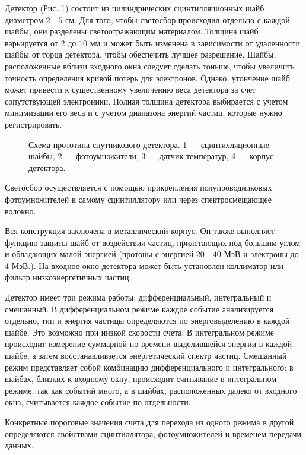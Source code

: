 \documentclass{config}
\begin{document}
Детектор (Рис. \ref{detector}) состоит из цилиндрических сцинтилляционных шайб диаметром $2$ - $5$ см. Для того, чтобы светосбор происходил отдельно с каждой шайбы, они разделены светоотражающим материалом. Толщина шайб варьируется от $2$ до $10$ мм и может быть изменена в зависимости от удаленности шайбы от торца детектора, чтобы обеспечить лучшее разрешение. Шайбы, расположенные вблизи входного окна следует сделать тоньше, чтобы увеличить точность определения кривой потерь для электронов. Однако, утончение шайб может привести к существенному увеличению веса детектора за счет сопутствующей электроники. Полная толщина детектора выбирается с учетом минимизации его веса и с учетом диапазона энергий частиц, которые нужно регистрировать.

\begin{figure}[h!]
\caption{Схема прототипа спутникового детектора. 1 --- сцинтилляционные шайбы, 2 --- фотоумножители, 3 --- датчик температур, 4 --- корпус детектора.}
\label{detector}
\end{figure}

Светосбор осуществляется с помощью прикрепления полупроводниковых фотоумножителей к самому сцинтиллятору или через спектросмещающее волокно.


Вся конструкция заключена в металлический корпус. Он также выполняет функцию защиты шайб от воздействия частиц, прилетающих под большим углом и обладающих малой энергией (протоны с энергией $20$ - $40$ МэВ и электроны до $4$ МэВ.). На входное окно детектора может быть установлен коллиматор или фильтр низкоэнергетичных частиц.

Детектор имеет три режима работы: дифференциальный, интегральный и смешанный. В дифференциальном режиме каждое событие анализируется отдельно, тип и энергия частицы определяются по энерговыделению в каждой шайбе. Это возможно при низкой скорости счета. В интегральном режиме происходит измерение суммарной по времени выделившейся энергии в каждой шайбе, а затем восстанавливается энергетический спектр частиц. Смешанный режим представляет собой комбинацию дифференциального и интегрального: в шайбах, близких к входному окну, происходит считывание в интегральном режиме, так как событий много, а в шайбах, расположенных далеко от входного окна, считывается каждое событие по отдельности.

Конкретные пороговые значения счета для перехода из одного режима в другой определяются свойствами сцинтиллятора, фотоумножителей и временем передачи данных.
\end{document}

